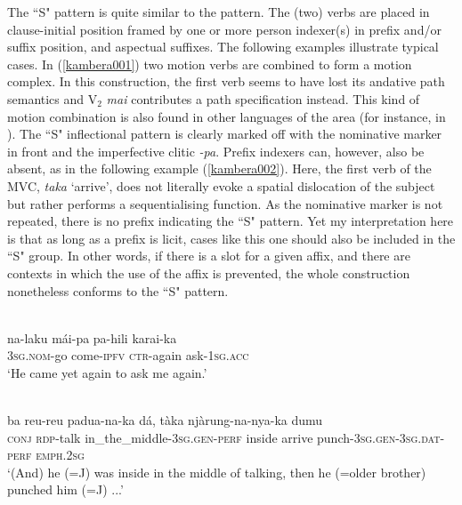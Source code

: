 \largerpage[1]
The  ``S" pattern is quite similar to the  pattern. The (two) verbs are placed in clause-initial position framed by one or more person indexer(s) in prefix and/or suffix position, and aspectual suffixes. The following examples illustrate typical cases. In (\ref{kambera001}) two motion verbs are combined to form a motion complex. In this construction, the first verb seems to have lost its andative path semantics and V$_2$ \textit{mai} contributes a path specification instead. This kind of motion combination is also found in other languages of the area (for instance, in ). The ``S" inflectional pattern is clearly marked off with the nominative marker in front and the imperfective clitic \textit{-pa}. Prefix indexers can, however, also be absent, as in the following example (\ref{kambera002}). Here, the first verb of the MVC, \textit{taka} `arrive', does not literally evoke a spatial dislocation of the subject but rather performs a sequentialising function. As the nominative marker is not repeated, there is no prefix indicating the ``S" pattern. Yet my interpretation here is that as long as a prefix is licit, cases like this one should also be included in the ``S" group. In other words, if there is a slot for a given affix, and there are contexts in which the use of the affix is prevented, the whole construction nonetheless conforms to the ``S" pattern.

\ea \label{kambera001}
\\
\gll na-laku mái-pa pa-hili karai-ka \\
3\textsc{sg}.\textsc{nom}-go come-\textsc{ipfv} \textsc{ctr}-again ask-1\textsc{sg}.\textsc{acc} \\
\glft `He came yet again to ask me again.'\\ 
\z

\ea \label{kambera002}
\\
\gll ba reu-reu padua-na-ka dá, tàka njàrung-na-nya-ka dumu \\
\textsc{conj} \textsc{rdp}-talk in\_the\_middle-3\textsc{sg}.\textsc{gen}-\textsc{perf} inside arrive punch-3\textsc{sg}.\textsc{gen}-3\textsc{sg}.\textsc{dat}-\textsc{perf} \textsc{emph}.2\textsc{sg} \\
\glft `(And) he (=J) was inside in the middle of talking, then he (=older brother) punched him (=J) ...'\\ 
\z

